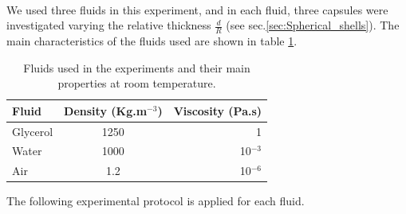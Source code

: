 \paragraph{}
We used three fluids in this experiment, and in each fluid, three capsules were investigated varying the relative thickness $\frac{d}{R}$ (see sec.\ref{sec:Spherical_shells}).
The main characteristics of the fluids used are shown in table \ref{tab:fluid_carac_spring}. 
\begin{table}[H]
	\centering
		\begin{tabular}{|l|c|r|}
			\hline
			Fluid & Density (Kg.m$^{-3}$) & Viscosity (Pa.s)\\
			\hline
			Glycerol & 1250 & 1 \\
			\hline
			Water & 1000 & 10$^{-3} $\\
			\hline
			Air &  1.2 & 10$^{-6}$\\
			\hline
		\end{tabular}
	\caption{Fluids used in the experiments and their main properties at room temperature.}
	\label{tab:fluid_carac_spring}
\end{table}
The following experimental protocol is applied for each fluid.
